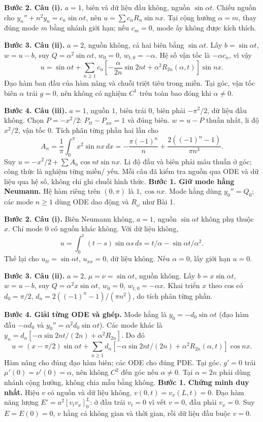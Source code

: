 \textbf{Bước 2. Câu (i).} $a=1$, biên và dữ liệu đầu không, nguồn $\sin\alpha t$. Chiếu nguồn cho $y_n''+n^2y_n=c_n\sin\alpha t$, nên $u=\sum c_nR_n\sin nx$. Tại cộng hưởng $\alpha=m$, thay đúng mode $m$ bằng nhánh giới hạn; nếu $c_m=0$, mode ấy không được kích thích.

\textbf{Bước 3. Câu (ii).} $a=2$, nguồn không, cả hai biên bằng $\sin\alpha t$. Lấy $b=\sin\alpha t$, $w=u-b$, suy $Q=\alpha^2\sin\alpha t$, $w_0=0$, $w_{t,0}=-\alpha$. Hệ số vận tốc là $-\alpha c_n$, vì vậy
\[u=\sin\alpha t+\sum_{n\ge1}c_n\left[-\frac\alpha{2n}\sin2nt+\alpha^2R_{2n}(\alpha,t)\right]\sin nx.\]
Đạo hàm ban đầu của hàm nâng và chuỗi triệt tiêu trong miền. Tại góc, vận tốc biên $\alpha$ trái $g=0$, nên không có nghiệm $C^1$ trên toàn bao đóng khi $\alpha\ne0$.

\textbf{Bước 4. Câu (iii).} $a=1$, nguồn $1$, biên trái $0$, biên phải $-\pi^2/2$, dữ liệu đầu không. Chọn $P=-x^2/2$: $P_{tt}-P_{xx}=1$ và đúng biên. $w=u-P$ thuần nhất, li độ $x^2/2$, vận tốc $0$. Tích phân từng phần hai lần cho
\[A_n=\frac1\pi\int_0^\pi x^2\sin nx\,dx
=-\frac{\pi(-1)^n}{n}+\frac{2((-1)^n-1)}{\pi n^3}.\]
Suy $u=-x^2/2+\sum A_n\cos nt\sin nx$. Li độ đầu và biên phải mâu thuẫn ở góc; công thức là nghiệm từng miền/ yếu. Mỗi câu đã kiểm tra nguồn qua ODE và dữ liệu qua hệ số, không chỉ ghi chuỗi hình thức.
\textbf{Bước 1. Giữ mode hằng Neumann.} Hệ hàm riêng trên $(0,\pi)$ là $1,\cos nx$. Mode hằng dùng $y_0''=Q_0$; các mode $n\ge1$ dùng ODE dao động và $R_\omega$ như Bài 1.

\textbf{Bước 2. Câu (i).} Biên Neumann không, $a=1$, nguồn $\sin\alpha t$ không phụ thuộc $x$. Chỉ mode $0$ có nguồn khác không. Với dữ liệu không,
\[u=\int_0^t(t-s)\sin\alpha s\,ds=t/\alpha-\sin\alpha t/\alpha^2.\]
Thế lại cho $u_{tt}=\sin\alpha t$, $u_{xx}=0$, dữ liệu không. Nếu $\alpha=0$, lấy giới hạn $u=0$.

\textbf{Bước 3. Câu (ii).} $a=2$, $\mu=\nu=\sin\alpha t$, nguồn không. Lấy $b=x\sin\alpha t$, $w=u-b$, suy $Q=\alpha^2x\sin\alpha t$, $w_0=0$, $w_{t,0}=-\alpha x$. Khai triển $x$ theo cos có $d_0=\pi/2$, $d_n=2((-1)^n-1)/(\pi n^2)$, do tích phân từng phần.

\textbf{Bước 4. Giải từng ODE và ghép.} Mode hằng là $y_0=-d_0\sin\alpha t$ (đạo hàm đầu $-\alpha d_0$ và $y_0''=\alpha^2d_0\sin\alpha t$). Các mode khác là $y_n=d_n[-\alpha\sin2nt/(2n)+\alpha^2R_{2n}]$. Do đó
\[u=(x-\pi/2)\sin\alpha t+\sum_{n\ge1}d_n[-\alpha\sin2nt/(2n)+\alpha^2R_{2n}(\alpha,t)]\cos nx.\]
Hàm nâng cho đúng đạo hàm biên; các ODE cho đúng PDE. Tại góc, $g'=0$ trái $\mu'(0)=\nu'(0)=\alpha$, nên không $C^2$ đến góc nếu $\alpha\ne0$. Tại $\alpha=2n$ phải dùng nhánh cộng hưởng, không chia mẫu bằng không.
\textbf{Bước 1. Chứng minh duy nhất.} Hiệu $v$ có nguồn và dữ liệu không, $v(0,t)=v_x(L,t)=0$. Đạo hàm năng lượng $E'=a^2[v_tv_x]_0^L$: ở đầu trái $v_t=0$ vì vết $v=0$, đầu phải $v_x=0$. Suy $E=E(0)=0$, $v$ hằng cả không gian và thời gian, rồi dữ liệu đầu buộc $v=0$.

